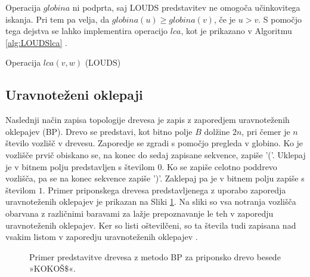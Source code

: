  Operacija $globina$ ni podprta, saj LOUDS predstavitev ne omogoča učinkovitega iskanja. Pri tem pa velja, da $globina(u)\ge globina(v)$, če je $u>v$. S pomočjo tega dejstva se lahko implementira operacijo $lca$, kot je prikazano v Algoritmu \ref{alg:LOUDSlca} \cite{Navarro2016}.
 
 \begin{algorithm}[hbt]

\caption{Operacija $lca(v,w)$ (LOUDS)}\label{alg:LOUDSlca}
{
    
}
\end{algorithm}


\subsection{Uravnoteženi oklepaji}\label{sec:oklepaji}

Naslednji način zapisa topologije drevesa je zapis z zaporedjem uravnoteženih oklepajev (BP). Drevo se predstavi, kot bitno polje $B$ dolžine $2n$, pri čemer je $n$ število vozlišč v drevesu. Zaporedje se zgradi s pomočjo pregleda v globino. Ko je vozlišče prvič obiskano se, na konec do sedaj zapisane sekvence, zapiše '('. Uklepaj je v bitnem polju predstavljen s številom $0$. Ko se zapiše celotno poddrevo vozlišča, pa se na konec sekvence zapiše ')'. Zaklepaj pa je v bitnem polju zapiše s številom $1$. Primer priponskega drevesa predstavljenega z uporabo zaporedja uravnoteženih oklepajev je prikazan na Sliki \ref{fig:BP}. Na sliki so vsa notranja vozlišča obarvana z različnimi baravami za lažje prepoznavanje le teh v zaporedju uravnoteženih oklepajev. Ker so listi oštevilčeni, so ta števila tudi zapisana nad vsakim listom v zaporedju uravnoteženih oklepajev \cite{Navarro2016}.

\begin{figure}[htb]
    \begin{center}
        
        \caption{Primer predstavitve drevesa z metodo BP za priponsko drevo besede »KOKOŠ$\$$«.} 
        \label{fig:BP}
    \end{center}
\end{figure}

